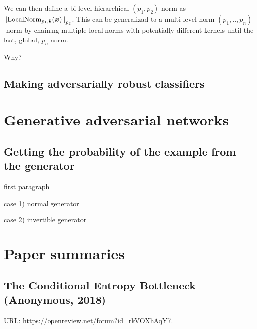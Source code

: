 \documentclass[twocolumn]{article}
\begin{document}
We can then define a bi-level hierarchical $(p_1,p_2)$-norm as $\enVert{\mathrm{LocalNorm}_{p_1,\vec k}(\vec x)}_{p_2}$. This can be generalizad to a multi-level norm $(p_1,..,p_n)$-norm by chaining multiple local norms with potentially different kernels until the last, global, $p_n$-norm.

Why?




\subsection{Making adversarially robust classifiers}



\section{Generative adversarial networks}

\subsection{Getting the probability of the example from the generator}

first paragraph

case 1) normal generator

case 2) invertible generator


\section{Paper summaries}

\subsection{The Conditional Entropy Bottleneck (Anonymous, 2018)}

URL: \url{https://openreview.net/forum?id=rkVOXhAqY7}.
\end{document}
